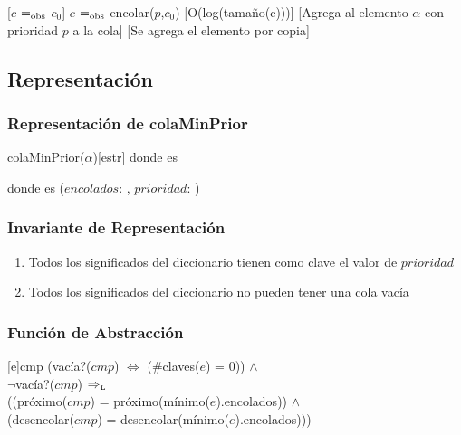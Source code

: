 	[$c$ $=_{\mathrm{obs}}$ $c_0$]
	{$c$ $=_{\mathrm{obs}}$ encolar($p$,$c_0$)}
	[O(log(tamaño(c)))]
	[Agrega al elemento $\alpha$ con prioridad $p$ a la cola]
	[Se agrega el elemento por copia]

\subsection{Representación}

	\subsubsection{Representación de colaMinPrior}

		\begin{Estructura}{colaMinPrior($\alpha$)}[estr]
			\- \- \- \- donde  es 

			\- \- \- \- donde  es
			($encolados$: ,
			$prioridad$: )
		\end{Estructura}

	\subsubsection{Invariante de Representación}

		\renewcommand{\labelenumi}{(\Roman{enumi})}

		\begin{enumerate}
			\item Todos los significados del diccionario tienen como clave
			el valor de $prioridad$
			\item Todos los significados del diccionario no pueden tener una
			cola vacía
		\end{enumerate}

	\mbox{}

	\subsubsection{Función de Abstracción}

		[e]{cmp}{
			(vacía?($cmp$) $\Leftrightarrow$ (\#claves($e$) = 0)) $\land$ \\
			\- $\neg$vacía?($cmp$) $\Rightarrow_{\mathrm{\scriptscriptstyle{L}}}$ \\
			\- \- ((próximo($cmp$) = próximo(mínimo($e$).encolados)) $\land$ \\
			\- \- (desencolar($cmp$) = desencolar(mínimo($e$).encolados)))
		}

